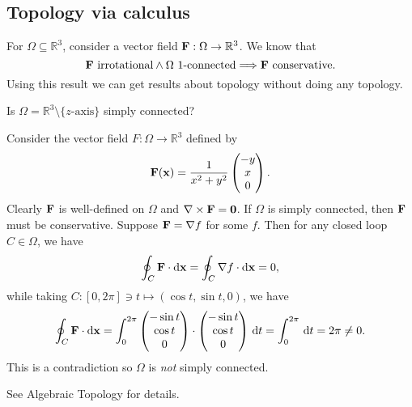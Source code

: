 \subsection{Topology via calculus}
For $ \Omega \subseteq \mathbb{R}^{3} $, consider a vector field $ {\bf F}:\Omega\to \mathbb{R}^{3} $. We know that 
\[
    {\bf F} \text{ irrotational} \land \Omega \text{ 1-connected} \Longrightarrow {\bf F} \text{ conservative}.
\]
Using this result we can get results about topology without doing any topology.
\begin{example}
    Is $ \Omega = \mathbb{R}^{3}\setminus \{z\text{-axis}\} $ simply connected?

    Consider the vector field $F : \Omega\to \mathbb{R}^{3}$ defined by
    \[
        {\bf F}({\bf x}) = \frac{1}{x^2+y^2}\begin{pmatrix}
            -y \\ x \\ 0
        \end{pmatrix}.
    \]
    Clearly ${\bf F}$ is well-defined on $\Omega$ and $ \nabla\times{\bf F}=\mathbf{0} $. If $ \Omega $ is simply connected, then ${\bf F}$ must be conservative. Suppose $ {\bf F} = \nabla f $ for some $f$. Then for any closed loop $C\in \Omega$, we have 
    \[
        \oint_{C} {\bf F}\cdot\mathrm{d} {\bf x} = \oint_C \nabla f \cdot \mathrm{d} {\bf x} = 0,
    \]
    while taking $ C:[0,2\pi]\ni t \mapsto (\cos t,\sin t,0) $, we have
    \[
        \oint_{C} {\bf F}\cdot\mathrm{d}{\bf x} = \int_{0}^{2\pi} \begin{pmatrix}
            -\sin t \\ \cos t \\ 0
        \end{pmatrix} \cdot \begin{pmatrix}
            -\sin t \\ \cos t \\ 0
        \end{pmatrix} \,\mathrm{d}t = \int_{0}^{2\pi}  \,\mathrm{d}t=2\pi\neq 0.
    \]
    This is a contradiction so $\Omega$ is \textit{not} simply connected.
\end{example}
See Algebraic Topology for details.